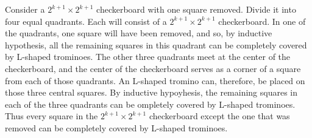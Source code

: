\vskip 3mm
Consider a $2^{k+1}\times 2^{k+1}$ checkerboard with one square removed. Divide it into four equal quadrants. Each will consist of a $2^{k+1}\times 2^{k+1}$ checkerboard. In one of the quadrants, one square will have been removed, and so, by inductive hypothesis, all the remaining squares in this quadrant can be completely covered by L-shaped trominoes. The other three quadrants meet at the center of the checkerboard, and the center of the checkerboard serves as a corner of a square from each of those quadrants. An L-shaped tromino can, therefore, be placed on those three central squares. By inductive hypoyhesis, the remaining squares in each of the three quadrants can be ompletely covered by L-shaped trominoes. Thus every square in the $2^{k+1}\times 2^{k+1}$ checkerboard except the one that was removed can be completely covered by L-shaped trominoes.



\vfill\eject
